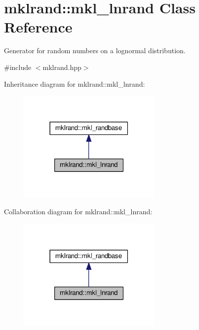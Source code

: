 \hypertarget{classmklrand_1_1mkl__lnrand}{}\section{mklrand\+:\+:mkl\+\_\+lnrand Class Reference}
\label{classmklrand_1_1mkl__lnrand}


Generator for random numbers on a lognormal distribution.  




{\ttfamily \#include $<$mklrand.\+hpp$>$}



Inheritance diagram for mklrand\+:\+:mkl\+\_\+lnrand\+:
\nopagebreak
\begin{figure}[H]
\begin{center}
\leavevmode
\includegraphics[width=198pt]{d0/d84/classmklrand_1_1mkl__lnrand__inherit__graph}
\end{center}
\end{figure}


Collaboration diagram for mklrand\+:\+:mkl\+\_\+lnrand\+:
\nopagebreak
\begin{figure}[H]
\begin{center}
\leavevmode
\includegraphics[width=198pt]{da/dc6/classmklrand_1_1mkl__lnrand__coll__graph}
\end{center}
\end{figure}
